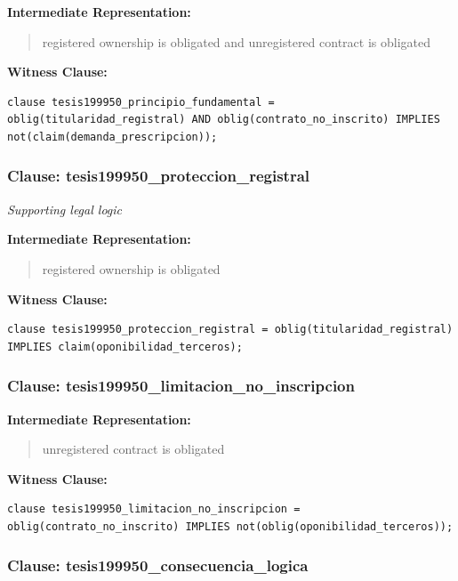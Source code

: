 \documentclass[11pt,a4paper]{article}
\begin{document}
\textbf{Intermediate Representation:}

\begin{quote}
registered ownership is obligated and unregistered contract is obligated
\end{quote}

\textbf{Witness Clause:}

\begin{lstlisting}[style=witnessstyle, language=Witness]
clause tesis199950_principio_fundamental = oblig(titularidad_registral) AND oblig(contrato_no_inscrito) IMPLIES not(claim(demanda_prescripcion));
\end{lstlisting}

\subsubsection{Clause: tesis199950\_proteccion\_registral}

\textit{Supporting legal logic}

\textbf{Intermediate Representation:}

\begin{quote}
registered ownership is obligated
\end{quote}

\textbf{Witness Clause:}

\begin{lstlisting}[style=witnessstyle, language=Witness]
clause tesis199950_proteccion_registral = oblig(titularidad_registral) IMPLIES claim(oponibilidad_terceros);
\end{lstlisting}

\subsubsection{Clause: tesis199950\_limitacion\_no\_inscripcion}

\textbf{Intermediate Representation:}

\begin{quote}
unregistered contract is obligated
\end{quote}

\textbf{Witness Clause:}

\begin{lstlisting}[style=witnessstyle, language=Witness]
clause tesis199950_limitacion_no_inscripcion = oblig(contrato_no_inscrito) IMPLIES not(oblig(oponibilidad_terceros));
\end{lstlisting}

\subsubsection{Clause: tesis199950\_consecuencia\_logica}
\end{document}
